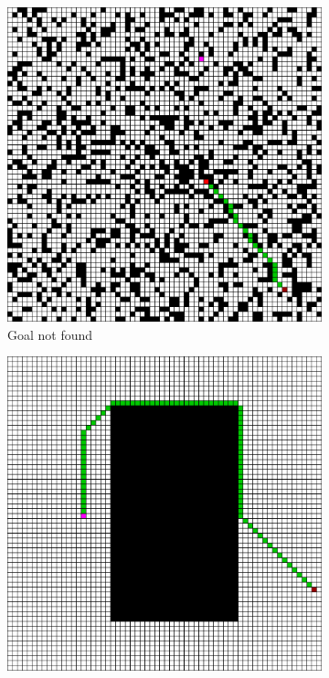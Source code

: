 \begin{figure}[h!]
  \centerfloat
  \begin{subfigure}[b]{0.33\linewidth}
    \includegraphics[width=\linewidth]{images/lstm_1_all_fail.png}
     \caption{Goal not found \newline}
  \end{subfigure}
  \hfill
  \begin{subfigure}[b]{0.33\linewidth}
    \includegraphics[width=\linewidth]{images/lstm_2_all_fail.png}

\end{subfigure}
\end{figure}
